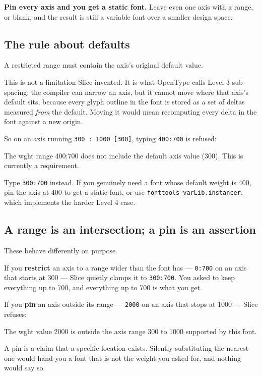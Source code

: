 \documentclass[11pt,a4paper]{article}
\begin{document}
\textbf{Pin every axis and you get a static font.} Leave even one axis with a range, or blank, and the result is still a variable font over a smaller design space.

\subsection{The rule about defaults}

A restricted range must contain the axis's original default value.

This is not a limitation Slice invented. It is what OpenType calls Level 3 sub-spacing: the compiler can narrow an axis, but it cannot move where that axis's default sits, because every glyph outline in the font is stored as a set of deltas measured \emph{from} the default. Moving it would mean recomputing every delta in the font against a new origin.

So on an axis running \texttt{300 : 1000 [300]}, typing \texttt{400:700} is refused:

\begin{code}
The wght range 400:700 does not include the default axis value (300).
This is currently a requirement.
\end{code}

Type \texttt{300:700} instead. If you genuinely need a font whose default weight is 400, pin the axis at 400 to get a static font, or use \texttt{fonttools varLib.instancer}, which implements the harder Level 4 case.

\subsection{A range is an intersection; a pin is an assertion}

These behave differently on purpose.

If you \textbf{restrict} an axis to a range wider than the font has --- \texttt{0:700} on an axis that starts at 300 --- Slice quietly clamps it to \texttt{300:700}. You asked to keep everything up to 700, and everything up to 700 is what you get.

If you \textbf{pin} an axis outside its range --- \texttt{2000} on an axis that stops at 1000 --- Slice refuses:

\begin{code}
The wght value 2000 is outside the axis range 300 to 1000 supported by this font.
\end{code}

A pin is a claim that a specific location exists. Silently substituting the nearest one would hand you a font that is not the weight you asked for, and nothing would say so.
\end{document}
